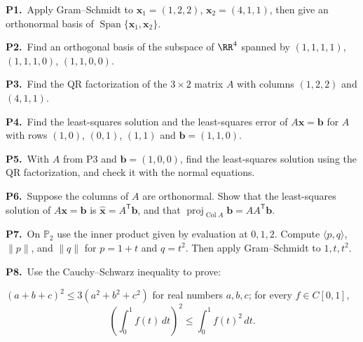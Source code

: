 \documentclass[10pt]{scrartcl}
\newcommand{\vv}[1]{\mathbf{#1}}
\newcommand{\ip}[2]{\langle #1,#2\rangle}
\DeclareMathOperator{\spn}{Span}\DeclareMathOperator{\Nul}{Nul}\DeclareMathOperator{\Col}{Col}\DeclareMathOperator{\Row}{Row}\DeclareMathOperator{\tr}{tr}\DeclareMathOperator{\proj}{proj}\DeclareMathOperator{\dist}{dist}
\begin{document}
\begin{prob}
  \textbf{P1.}\ Apply Gram--Schmidt to $\vv x_1=(1,2,2)$, $\vv x_2=(4,1,1)$, then give an orthonormal basis of $\spn\{\vv x_1,\vv x_2\}$.
\end{prob}

\begin{prob}
  \textbf{P2.}\ Find an orthogonal basis of the subspace of $\RR^4$ spanned by $(1,1,1,1)$, $(1,1,1,0)$, $(1,1,0,0)$.
\end{prob}

\begin{prob}
  \textbf{P3.}\ Find the QR factorization of the $3\times2$ matrix $A$ with columns $(1,2,2)$ and $(4,1,1)$.
\end{prob}

\begin{prob}
  \textbf{P4.}\ Find the least-squares solution and the least-squares error of $A\vv x=\vv b$ for $A$ with rows $(1,0)$, $(0,1)$, $(1,1)$ and $\vv b=(1,1,0)$.
\end{prob}

\begin{prob}
  \textbf{P5.}\ With $A$ from P3 and $\vv b=(1,0,0)$, find the least-squares solution using the QR factorization, and check it with the normal equations.
\end{prob}

\begin{prob}
  \textbf{P6.}\ Suppose the columns of $A$ are orthonormal. Show that the least-squares solution of $A\vv x=\vv b$ is $\hat{\vv x}=A^{\mathsf T}\vv b$, and that $\proj_{\Col A}\vv b=AA^{\mathsf T}\vv b$.
\end{prob}

\begin{prob}
  \textbf{P7.}\ On $\mathbb P_2$ use the inner product given by evaluation at $0,1,2$. Compute $\ip{p}{q}$, $\|p\|$, and $\|q\|$ for $p=1+t$ and $q=t^2$. Then apply Gram--Schmidt to $1,t,t^2$.
\end{prob}

\begin{prob}
  \textbf{P8.}\ Use the Cauchy--Schwarz inequality to prove:
  \begin{enumerate}[(a)]
    \ii $(a+b+c)^2\le 3(a^2+b^2+c^2)$ for real numbers $a,b,c$;
    \ii for every $f\in C[0,1]$,
    \[
      \left(\int_0^1 f(t)\,dt\right)^2 \le \int_0^1 f(t)^2\,dt.
    \]
  \end{enumerate}
\end{prob}
\end{document}
